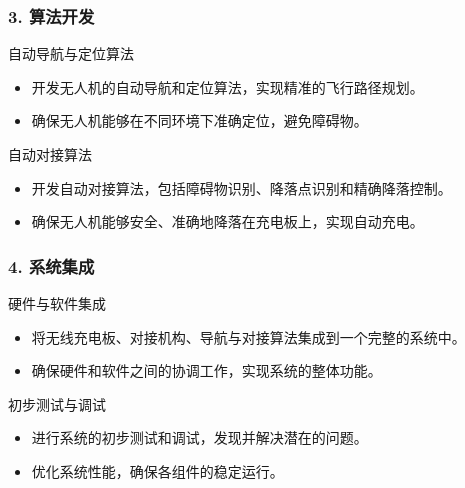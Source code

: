   \begin{frame}
  \frametitle{3. 算法开发}
  
  \begin{block}{自动导航与定位算法}
      \begin{itemize}
          \item 开发无人机的自动导航和定位算法，实现精准的飞行路径规划。
          \item 确保无人机能够在不同环境下准确定位，避免障碍物。
      \end{itemize}
  \end{block}
  
  \begin{block}{自动对接算法}
      \begin{itemize}
          \item 开发自动对接算法，包括障碍物识别、降落点识别和精确降落控制。
          \item 确保无人机能够安全、准确地降落在充电板上，实现自动充电。
      \end{itemize}
  \end{block}
  
  \end{frame}
  
  \begin{frame}
  \frametitle{4. 系统集成}
  
  \begin{block}{硬件与软件集成}
      \begin{itemize}
          \item 将无线充电板、对接机构、导航与对接算法集成到一个完整的系统中。
          \item 确保硬件和软件之间的协调工作，实现系统的整体功能。
      \end{itemize}
  \end{block}
  
  \begin{block}{初步测试与调试}
      \begin{itemize}
          \item 进行系统的初步测试和调试，发现并解决潜在的问题。
          \item 优化系统性能，确保各组件的稳定运行。
      \end{itemize}
  \end{block}
  
  \end{frame}
  
